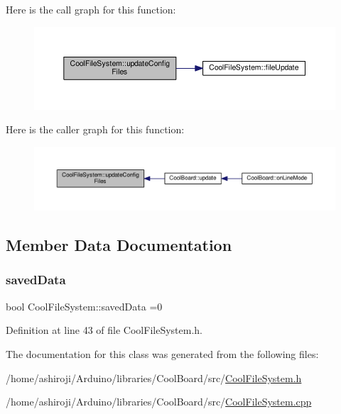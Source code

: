 Here is the call graph for this function\+:\nopagebreak
\begin{figure}[H]
\begin{center}
\leavevmode
\includegraphics[width=350pt]{db/d0c/class_cool_file_system_adfa8e2e80641ae6f0cceabd348a9b841_cgraph}
\end{center}
\end{figure}
Here is the caller graph for this function\+:\nopagebreak
\begin{figure}[H]
\begin{center}
\leavevmode
\includegraphics[width=350pt]{db/d0c/class_cool_file_system_adfa8e2e80641ae6f0cceabd348a9b841_icgraph}
\end{center}
\end{figure}


\subsection{Member Data Documentation}
\mbox{\label{class_cool_file_system_ad398e0c5c41a0c88acdf5d672aa71351}} 
\subsubsection{\texorpdfstring{saved\+Data}{savedData}}
{\footnotesize\ttfamily bool Cool\+File\+System\+::saved\+Data =0\hspace{0.3cm}{\ttfamily [private]}}



Definition at line 43 of file Cool\+File\+System.\+h.



The documentation for this class was generated from the following files\+:\begin{DoxyCompactItemize}
\item 
/home/ashiroji/\+Arduino/libraries/\+Cool\+Board/src/\hyperlink{_cool_file_system_8h}{Cool\+File\+System.\+h}\item 
/home/ashiroji/\+Arduino/libraries/\+Cool\+Board/src/\hyperlink{_cool_file_system_8cpp}{Cool\+File\+System.\+cpp}\end{DoxyCompactItemize}
